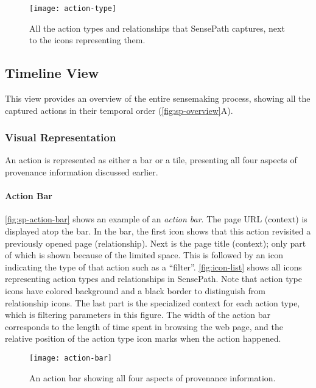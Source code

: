 \begin{figure}
	\centering
	\texttt{[image: action-type]}
	\caption[Action types and relationships]{All the action types and relationships that SensePath captures, next to the icons representing them.}
	\label{fig:icon-list}
\end{figure}

\subsection{Timeline View}
This view provides an overview of the entire sensemaking process, showing all the captured actions in their temporal order (\autoref{fig:sp-overview}A).

\subsubsection{Visual Representation}
An action is represented as either a bar or a tile, presenting all four aspects of provenance information discussed earlier.

\paragraph{Action Bar}
\autoref{fig:sp-action-bar} shows an example of an \textit{action bar}. The page URL (context) is displayed atop the bar. In the bar, the first icon shows that this action revisited a previously opened page (relationship). Next is the page title (context); only part of which is shown because of the limited space. This is followed by an icon indicating the type of that action such as a ``filter''. \autoref{fig:icon-list} shows all icons representing action types and relationships in SensePath. Note that action type icons have colored background and a black border to distinguish from relationship icons. The last part is the specialized context for each action type, which is filtering parameters in this figure. The width of the action bar corresponds to the length of time spent in browsing the web page, and the relative position of the action type icon marks when the action happened.

\begin{figure}
\centering
\texttt{[image: action-bar]}
\caption[An action bar]{An action bar showing all four aspects of provenance information.}
\label{fig:sp-action-bar}
\end{figure}

